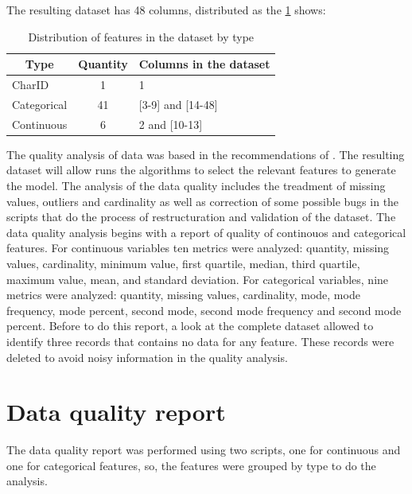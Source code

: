 \documentclass[]{book}
\begin{document}
The resulting dataset has 48 columns, distributed as the
\ref{tab:distribution-of-features-by-type} shows:

\begin{table}[ht]
\centering
\caption{Distribution of features in the dataset by type}
\label{tab:distribution-of-features-by-type}
\begin{tabular}{|l|c|l|}
\hline
\multicolumn{1}{|c|}{\textbf{Type}} & \textbf{Quantity} & \multicolumn{1}{c|}{\textbf{Columns in the dataset}} \\ \hline
CharID                              & 1                 & 1                                                    \\ \hline
Categorical                         & 41                & {[}3-9{]} and {[}14-48{]}                            \\ \hline
Continuous                          & 6                 & 2 and {[}10-13{]}                                    \\ \hline
\end{tabular}
\end{table}

The quality analysis of data was based in the recommendations of
\citep{Kelleher2015}. The resulting dataset will allow runs the
algorithms to select the relevant features to generate the model. The
analysis of the data quality includes the treadment of missing values,
outliers and cardinality as well as correction of some possible bugs in
the scripts that do the process of restructuration and validation of the
dataset. The data quality analysis begins with a report of quality of
continouos and categorical features. For continuous variables ten
metrics were analyzed: quantity, missing values, cardinality, minimum
value, first quartile, median, third quartile, maximum value, mean, and
standard deviation. For categorical variables, nine metrics were
analyzed: quantity, missing values, cardinality, mode, mode frequency,
mode percent, second mode, second mode frequency and second mode
percent. Before to do this report, a look at the complete dataset
allowed to identify three records that contains no data for any feature.
These records were deleted to avoid noisy information in the quality
analysis.

\section{Data quality report}\label{data-quality-report}

The data quality report was performed using two scripts, one for
continuous and one for categorical features, so, the features were
grouped by type to do the analysis.
\end{document}
